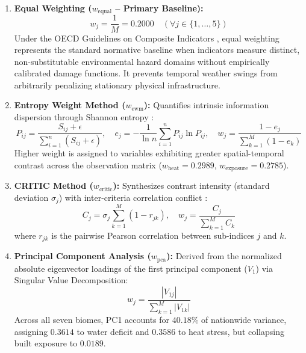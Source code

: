 \begin{enumerate}
    \item \textbf{Equal Weighting ($w_{\text{equal}}$ -- Primary Baseline):} 
    \begin{equation}
        w_j = \frac{1}{M} = 0.2000 \quad (\forall j \in \{1, \dots, 5\})
    \end{equation}
    Under the OECD Guidelines on Composite Indicators \citep{oecd2008handbook}, equal weighting represents the standard normative baseline when indicators measure distinct, non-substitutable environmental hazard domains without empirically calibrated damage functions. It prevents temporal weather swings from arbitrarily penalizing stationary physical infrastructure.
    
    \item \textbf{Entropy Weight Method ($w_{\text{ewm}}$):} Quantifies intrinsic information dispersion through Shannon entropy \citep{shannon1948mathematical}:
    \begin{equation}
        P_{ij} = \frac{S_{ij} + \epsilon}{\sum_{i=1}^{n} (S_{ij} + \epsilon)}, \quad e_j = -\frac{1}{\ln n}\sum_{i=1}^{n} P_{ij} \ln P_{ij}, \quad w_j = \frac{1 - e_j}{\sum_{k=1}^{M} (1 - e_k)}
    \end{equation}
    Higher weight is assigned to variables exhibiting greater spatial-temporal contrast across the observation matrix ($w_{\text{heat}} = 0.2989$, $w_{\text{exposure}} = 0.2785$).
    
    \item \textbf{CRITIC Method ($w_{\text{critic}}$):} Synthesizes contrast intensity (standard deviation $\sigma_j$) with inter-criteria correlation conflict \citep{diakoulaki1995determining}:
    \begin{equation}
        C_j = \sigma_j \sum_{k=1}^{M} (1 - r_{jk}), \quad w_j = \frac{C_j}{\sum_{k=1}^{M} C_k}
    \end{equation}
    where $r_{jk}$ is the pairwise Pearson correlation between sub-indices $j$ and $k$.
    
    \item \textbf{Principal Component Analysis ($w_{\text{pca}}$):} Derived from the normalized absolute eigenvector loadings of the first principal component ($V_1$) via Singular Value Decomposition:
    \begin{equation}
        w_j = \frac{|V_{1j}|}{\sum_{k=1}^{M} |V_{1k}|}
    \end{equation}
    Across all seven biomes, PC1 accounts for $40.18\%$ of nationwide variance, assigning $0.3614$ to water deficit and $0.3586$ to heat stress, but collapsing built exposure to $0.0189$.
\end{enumerate}

